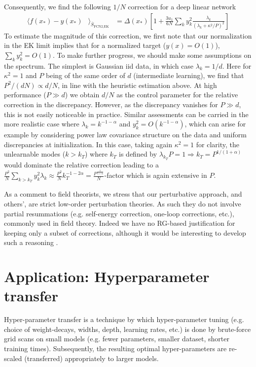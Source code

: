 Consequently, we find the following $1/N$ correction for a deep linear network 
\begin{align}
\langle f(x_*) - y(x_*) &\rangle_{\bar{S}_{\text{FCN2,EK}}} &= \Delta(x_*)\left[1+\frac{3 u_1}{6N} \sum_k y_k^2 \frac{\lambda_k}{(\lambda_k+\kappa^2/P)^2} \right]
\end{align}
To estimate the magnitude of this correction, we first note that our normalization in the EK limit implies that for a normalized target ($y(x)=O(1)$), $\sum_k y_k^2=O(1)$. To make further progress, we should make some assumptions on the spectrum. The simplest is Gaussian iid data, in which case $\lambda_k=1/d$. Here for $\kappa^2=1$ and $P$ being of the same order of $d$ (intermediate learning), we find that $P^2/(dN)\propto d/N$, in line with the heuristic estimation above. At high performance ($P \gg d$) we obtain $d/N$ as the control parameter for the relative correction in the discrepancy. However, as the discrepancy vanishes for $P \gg d$, this is not easily noticeable in practice. Similar assessments can be carried in the more realistic case where $\lambda_k = k^{-1-\alpha}$ and $y^2_k = O(k^{-1-\alpha})$, which can arise for example by considering power law covariance structure on the data and uniform discrepancies at initialization. In this case, taking again $\kappa^2=1$ for clarity, the unlearnable modes ($k > k_T$) where $k_T$ is defined by $\lambda_{k_T}P=1 \Rightarrow k_T = P^{1/(1+\alpha)}$ would dominate the relative correction leading to a $\frac{P^2}{N} \sum_{k>k_{T}} y_k^2 \lambda_k \approx \frac{P^2}{N} k^{-1-2\alpha}_{T}=\frac{P^{\frac{1}{1+\alpha}}}{N}$-factor which is again extensive in $P$. 

As a comment to field theorists, we stress that our perturbative approach, and others', \citep{roberts2021principles} are strict low-order perturbation theories. As such they do not involve partial resummations (e.g. self-energy correction, one-loop corrections, etc.), commonly used in field theory. Indeed we have no RG-based justification for keeping only a subset of corrections, although it would be interesting to develop such a reasoning \citep{howard2024}. 


\section{Application: Hyperparameter transfer}
\label{Sec:Hyper}
Hyper-parameter transfer is a technique by which hyper-parameter tuning (e.g. choice of weight-decays, widths, depth, learning rates, etc.) is done by brute-force grid scans on small models (e.g. fewer parameters, smaller dataset, shorter training times). Subsequently, the resulting optimal hyper-parameters are re-scaled (transferred) appropriately to larger models.    

